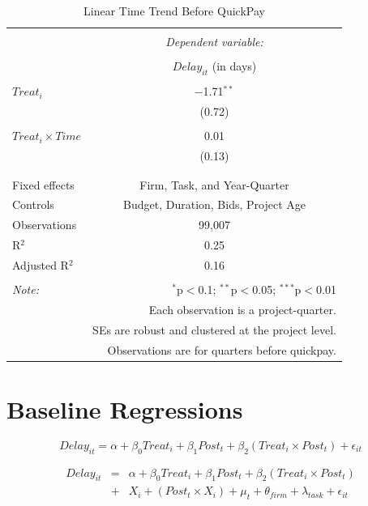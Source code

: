 \documentclass[
]{article}
\begin{document}
\begin{table}[H] \centering 
  \caption{Linear Time Trend Before QuickPay} 
  \label{} 
\small 
\begin{tabular}{@{\extracolsep{5pt}}lc} 
\\[-1.8ex]\hline 
\hline \\[-1.8ex] 
 & \multicolumn{1}{c}{\textit{Dependent variable:}} \\ 
\cline{2-2} 
\\[-1.8ex] & $Delay_{it}$ (in days) \\ 
\hline \\[-1.8ex] 
 $Treat_i$ & $-$1.71$^{**}$ \\ 
  & (0.72) \\ 
  & \\ 
 $Treat_i \times Time$ & 0.01 \\ 
  & (0.13) \\ 
  & \\ 
\hline \\[-1.8ex] 
Fixed effects & Firm, Task, and Year-Quarter \\ 
Controls & Budget, Duration, Bids, Project Age \\ 
Observations & 99,007 \\ 
R$^{2}$ & 0.25 \\ 
Adjusted R$^{2}$ & 0.16 \\ 
\hline 
\hline \\[-1.8ex] 
\textit{Note:}  & \multicolumn{1}{r}{$^{*}$p$<$0.1; $^{**}$p$<$0.05; $^{***}$p$<$0.01} \\ 
 & \multicolumn{1}{r}{Each observation is a project-quarter.} \\ 
 & \multicolumn{1}{r}{SEs are robust and clustered at the project level.} \\ 
 & \multicolumn{1}{r}{Observations are for quarters before quickpay.} \\ 
\end{tabular} 
\end{table}

\hypertarget{baseline-regressions}{%
\section{Baseline Regressions}\label{baseline-regressions}}

\[ Delay_{it} = \alpha+\beta_0 Treat_i + \beta_1 Post_t + \beta_2 (Treat_i \times Post_t) + \epsilon_{it}\]

\[ \begin{aligned} Delay_{it} &=& \alpha+\beta_0 Treat_i + \beta_1 Post_t + \beta_2 (Treat_i \times Post_t)\\
&+&  X_i + (Post_t \times X_i) + \mu_t + \theta_{firm} + \lambda_{task}+ \epsilon_{it}
\end{aligned}\]
\end{document}
